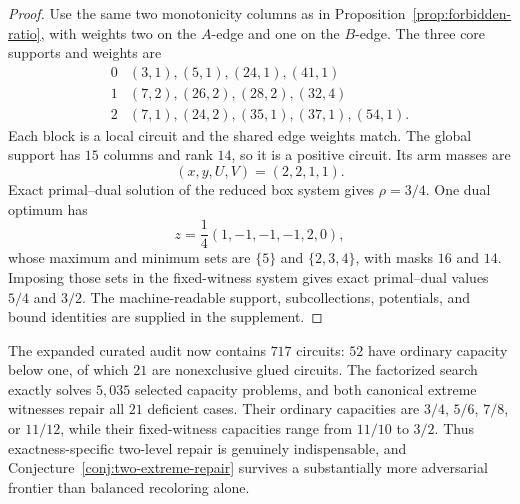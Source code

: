 \documentclass[11pt]{article}
\begin{document}
\begin{proof}
Use the same two monotonicity columns as in
Proposition~\ref{prop:forbidden-ratio}, with weights two on the $A$-edge and
one on the $B$-edge.  The three core supports and weights are
\[
\begin{array}{c|l}
0&(3,1),(5,1),(24,1),(41,1)\\
1&(7,2),(26,2),(28,2),(32,4)\\
2&(7,1),(24,2),(35,1),(37,1),(54,1).
\end{array}
\]
Each block is a local circuit and the shared edge weights match.
The global support has $15$ columns and rank $14$, so it is a positive
circuit.  Its arm masses are
\[
 (x,y,U,V)=(2,2,1,1).
\]
Exact primal--dual solution of the reduced box system gives
$\rho=3/4$.  One dual optimum has
\[
 z=\frac14(1,-1,-1,-1,2,0),
\]
whose maximum and minimum sets are $\{5\}$ and $\{2,3,4\}$, with masks
$16$ and $14$.  Imposing those sets in the fixed-witness system gives
exact primal--dual values $5/4$ and $3/2$.  The machine-readable support,
subcollections, potentials, and bound identities are supplied in the
supplement.
\end{proof}

The expanded curated audit now contains $717$ circuits: $52$ have ordinary
capacity below one, of which $21$ are nonexclusive glued circuits.  The
factorized search exactly solves $5{,}035$ selected capacity problems, and
both canonical extreme witnesses repair all $21$ deficient cases.  Their
ordinary capacities are $3/4$, $5/6$, $7/8$, or $11/12$, while their
fixed-witness capacities range from $11/10$ to $3/2$.  Thus
exactness-specific two-level repair is genuinely indispensable, and
Conjecture~\ref{conj:two-extreme-repair} survives a substantially more
adversarial frontier than balanced recoloring alone.
\end{document}
